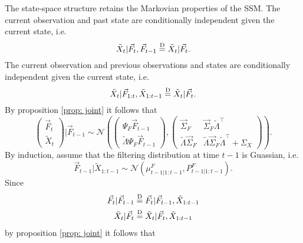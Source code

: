 The state-space structure retains the Markovian properties of the SSM. The current observation and past state are conditionally independent given the current state, i.e.
\begin{equation*}
	\tilde{X}_{t} | \vec{F}_{t}, \vec{F}_{t-1} \overset{\text D}{=} \tilde{X}_{t} \vert \vec{F}_{t}.
\end{equation*}
The current observation and previous observations and states are conditionally independent given the current state, i.e.
\begin{equation*}
	\tilde{X}_{t} | \vec{F}_{1:t}, \tilde{X}_{1:t-1} \overset{\text D}{=} \tilde{X}_{t} \vert \vec{F}_{t}.
\end{equation*}
By proposition \ref{prop: joint} it follows that
\begin{equation}
	\begin{pmatrix} \vec{F}_{t} \\ \tilde{X}_{t} \end{pmatrix} 
	\vert \vec{F}_{t-1} \sim 
	\mathcal N \left( 
		\begin{pmatrix} \Psi_{F} \vec{F}_{t-1} \\ \tilde{\Lambda} \Psi_{F} \vec{F}_{t-1} \end{pmatrix},
		\begin{pmatrix} 
			\vec{\Sigma}_F & \vec{\Sigma}_F \tilde{\Lambda}^{\top} \\ 
			\tilde{\Lambda} \vec{\Sigma}_F & \tilde{\Lambda} \vec{\Sigma}_F \tilde{\Lambda}^{\top} + \Sigma_X
		\end{pmatrix} 
	\right).
\end{equation}
By induction, assume that the filtering distribution at time $t-1$ is Guassian, i.e. 
\begin{equation}
	\vec{F}_{t-1} | \tilde{X}_{1:t-1} \sim \mathcal N (\mu_{t-1 | 1:t-1}^F, P_{t-1 | 1:t-1}^F).
\end{equation}
Since 
\begin{equation*}
	\begin{aligned}
		\vec{F}_{t} | \vec{F}_{t-1} &\overset{\text D}{=} \vec{F}_{t} | \vec{F}_{t-1}, \tilde{X}_{1:t-1} \\
		\tilde{X}_{t} \vert \vec{F}_{t} &\overset{\text D}{=} \tilde{X}_{t} | \vec{F}_{t}, \tilde{X}_{1:t-1}
	\end{aligned}
\end{equation*}
 by proposition \ref{prop: joint} it follows that 

